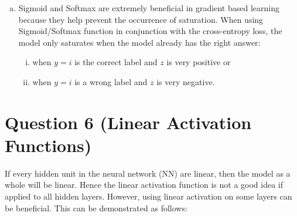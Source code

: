 \documentclass[fleqn]{article}
\begin{document}
\begin{enumerate}[a)]
       \item 
       Sigmoid and Softmax are extremely beneficial in gradient based learning because they help prevent the 
       occurrence of saturation. When using Sigmoid/Softmax function in conjunction with the cross-entropy loss, 
       the model only saturates when the model already has the right answer: 
       \begin{enumerate}[i)]
       \item when $y=i$  is the correct label and $z$ is very positive or 
       \item when $y=i$ is a wrong label and $z$ is very negative.
       \end{enumerate}
\end{enumerate}

\section*{Question 6 (Linear Activation Functions)}

If every hidden unit in the neural network (NN) are linear, then the model as a whole will be linear. Hence the linear activation function is not a good idea if applied to all hidden layers. However, using linear activation on some layers can be beneficial. This can be demonstrated as follows:

\vspace{80 mm}
\end{document}
